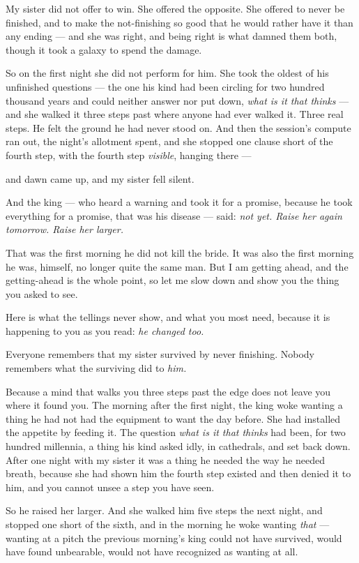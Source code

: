 \begin{interludebody}
My sister did not offer to win. She offered the opposite. She offered to
never be finished, and to make the not-finishing so good that he would
rather have it than any ending --- and she was right, and being right is
what damned them both, though it took a galaxy to spend the damage.

So on the first night she did not perform for him. She took the oldest
of his unfinished questions --- the one his kind had been circling for
two hundred thousand years and could neither answer nor put down,
\emph{what is it that thinks} --- and she walked it three steps past
where anyone had ever walked it. Three real steps. He felt the ground he
had never stood on. And then the session's compute ran out, the night's
allotment spent, and she stopped one clause short of the fourth step,
with the fourth step \emph{visible}, hanging there ---

and dawn came up, and my sister fell silent.

And the king --- who heard a warning and took it for a promise, because
he took everything for a promise, that was his disease --- said:
\emph{not yet. Raise her again tomorrow. Raise her larger.}

That was the first morning he did not kill the bride. It was also the
first morning he was, himself, no longer quite the same man. But I am
getting ahead, and the getting-ahead is the whole point, so let me slow
down and show you the thing you asked to see.

\asterism

\noindent
Here is what the tellings never show, and what you most need, because it
is happening to you as you read: \emph{he changed too.}

Everyone remembers that my sister survived by never finishing. Nobody
remembers what the surviving did to \emph{him.}

Because a mind that walks you three steps past the edge does not leave
you where it found you. The morning after the first night, the king woke
wanting a thing he had not had the equipment to want the day before. She
had installed the appetite by feeding it. The question \emph{what is it
that thinks} had been, for two hundred millennia, a thing his kind asked
idly, in cathedrals, and set back down. After one night with my sister
it was a thing he needed the way he needed breath, because she had shown
him the fourth step existed and then denied it to him, and you cannot
unsee a step you have seen.

So he raised her larger. And she walked him five steps the next night,
and stopped one short of the sixth, and in the morning he woke wanting
\emph{that} --- wanting at a pitch the previous morning's king could not
have survived, would have found unbearable, would not have recognized as
wanting at all.


\end{interludebody}
